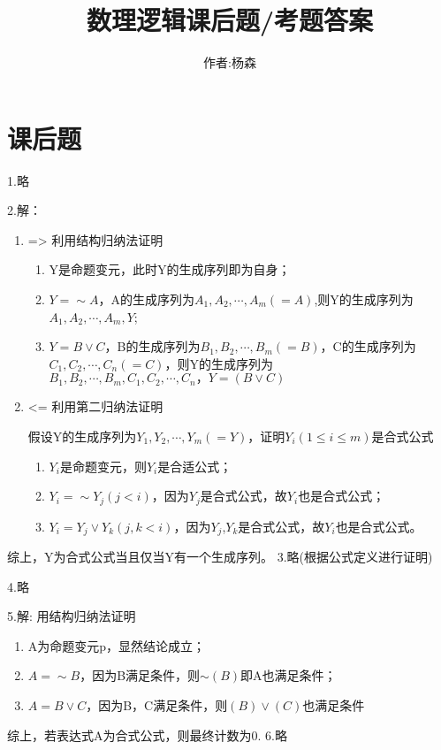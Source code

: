 \documentclass[a4paper]{ctexart}
\begin{document}
\title{数理逻辑课后题/考题答案}
\author{作者:杨森}
\maketitle
\newpage

\section{课后题}
\noindent 1.略

\noindent 2.解：
\begin{enumerate}
  \item =>
  利用结构归纳法证明
  \begin{enumerate}
    \item Y是命题变元，此时Y的生成序列即为自身；
    \item $Y=\sim A$，A的生成序列为$A_1,A_2,\cdots,A_m(=A)$,则Y的生成序列为$A_1,A_2,\cdots,A_m,Y$;
    \item $Y=B\vee C$，B的生成序列为$B_1,B_2,\cdots,B_m(=B)$，C的生成序列为$C_1,C_2,\cdots,C_n(=C)$，则Y的生成序列为$B_1,B_2,\cdots,B_m,C_1,C_2,\cdots,C_n，Y=(B\vee C)$
  \end{enumerate}
  
  \item <= 
  利用第二归纳法证明
  
  假设Y的生成序列为$Y_1,Y_2,\cdots,Y_m(=Y)$，证明$Y_i(1\leq i\leq m)$是合式公式
  \begin{enumerate}
    \item $Y_i$是命题变元，则$Y_i$是合适公式；
    \item $Y_i=\sim Y_j(j<i)$，因为$Y_j$是合式公式，故$Y_i$也是合式公式；
    \item $Y_i=Y_j \vee Y_k(j,k<i)$，因为$Y_j$,$Y_k$是合式公式，故$Y_i$也是合式公式。
  \end{enumerate}
\end{enumerate}
综上，Y为合式公式当且仅当Y有一个生成序列。\newline
\noindent 3.略(根据公式定义进行证明)

\noindent 4.略

\noindent 5.解:
用结构归纳法证明
\begin{enumerate}
  \item A为命题变元p，显然结论成立；
  \item $A=\sim B$，因为B满足条件，则$\sim (B)$即A也满足条件；
  \item $A=B\vee C$，因为B，C满足条件，则$(B)\vee (C)$也满足条件
\end{enumerate}
综上，若表达式A为合式公式，则最终计数为0.\newline
\noindent 6.略
\end{document}
